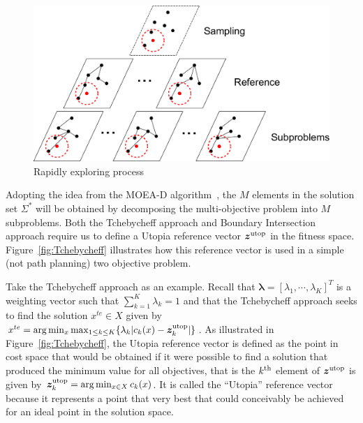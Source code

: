 \documentclass[phd]{byuprop}
\begin{document}
\begin{figure}[htbp]
	\centering
	\includegraphics[width=0.55\linewidth]{./fig/MORRTstar}
	\caption{Rapidly exploring process}
	\label{fig:MORRTstar}
\end{figure}

Adopting the idea from the MOEA-D algorithm~\cite{Zhang2007}, the $M$ elements in the solution set $\Sigma^{*}$ will be obtained by decomposing the multi-objective problem into $ M $ subproblems.  
Both the Tchebycheff approach and Boundary Intersection approach require us to define a Utopia reference vector $ \bm{z}^{\rm utop} $ in the fitness space. 
Figure~\ref{fig:Tchebycheff} illustrates how this reference vector is used in a simple (not path planning) two objective problem.  

Take the Tchebycheff approach as an example.
Recall that  $ \bm{\lambda} = [ \lambda_{1} , \cdots , \lambda_{K}  ]^{T} $ is a weighting vector such that $ \sum_{k=1}^{K} \lambda_{k} = 1 $ and that the Tchebycheff approach seeks to find the solution $ x^{te}\in X $ given by $ x^{te} = \arg\min_x \max_{1 \leq k \leq K}  \{ \lambda_{k} | c_{k}(x) - \bm{z}^{\rm utop}_{k}  | \} $.  
As illustrated in Figure~\ref{fig:Tchebycheff}, the Utopia reference vector is defined as the point in cost space that would be obtained if it were possible to find a solution that produced the minimum value for all objectives, that is the $k^{\rm th}$ element of $\bm{z}^{\rm utop}$ is given by $\bm{z}^{\rm utop}_{k} = \arg \min_{x \in X} c_{k}(x)$.  
It is called the ``Utopia'' reference vector because it represents a point that very best that could conceivably be achieved for an ideal point in the solution space.
\end{document}
